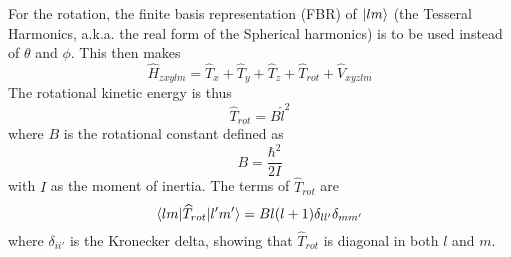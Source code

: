 \documentclass{revtex4-1}
\begin{document}
For the rotation, the finite basis representation (FBR) of $\ket{lm}$ (the Tesseral Harmonics, a.k.a. the real form of the Spherical harmonics) is to be used instead of $\theta$ and $\phi$. This then makes
\begin{equation}
\widehat{H}_{zxylm} = \widehat{T}_{x} + \widehat{T}_{y} + \widehat{T}_{z} + \widehat{T}_{rot} + \widehat{V}_{xyzlm} 
\end{equation}
The rotational kinetic energy is thus
\begin{equation}
\widehat{T}_{rot} = B\hat{l}^{2}
\end{equation}
where $B$ is the rotational constant defined as
\begin{equation}
B = \frac{\hbar^{2}}{2I}
\end{equation}
with $I$ as the moment of inertia. The terms of $\widehat{T}_{rot}$ are
\begin{equation}
\braket{lm|\widehat{T}_{rot}|l'm'} = Bl(l+1)\delta_{ll'}\delta_{mm'}
\end{equation}
where $\delta_{ii'}$ is the Kronecker delta, showing that $\widehat{T}_{rot}$ is diagonal in both $l$ and $m$.
\end{document}
